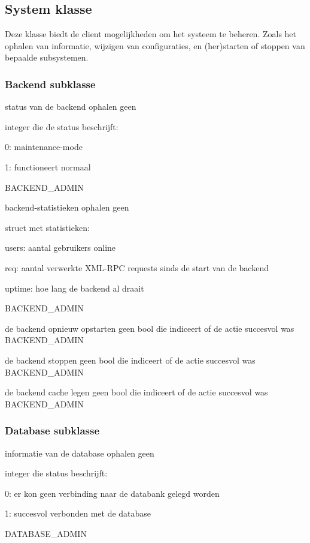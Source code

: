 \subsection{System klasse}

Deze klasse biedt de client mogelijkheden om het systeem te beheren. Zoals het ophalen van informatie, wijzigen van configuraties, en (her)starten of stoppen van bepaalde subsystemen.

\subsubsection{Backend subklasse}

	{ status van de backend ophalen }
	{ geen }
	{ integer die de status beschrijft:
		\begin{itemize_compact}
		\item{0: maintenance-mode}
		\item{1: functioneert normaal}
		\end{itemize_compact} }
	{ BACKEND\_ADMIN }

	{ backend-statistieken ophalen }
	{ geen }
	{ struct met statistieken:
		\begin{itemize_compact}
		\item{users: aantal gebruikers online}
		\item{req: aantal verwerkte XML-RPC requests sinds de start van de backend}
		\item{uptime: hoe lang de backend al draait}
		\end{itemize_compact} }
	{ BACKEND\_ADMIN }

	{ de backend opnieuw opstarten }
	{ geen }
	{ bool die indiceert of de actie succesvol was }
	{ BACKEND\_ADMIN }

	{ de backend stoppen }
	{ geen }
	{ bool die indiceert of de actie succesvol was }
	{ BACKEND\_ADMIN }

	{ de backend cache legen }
	{ geen }
	{ bool die indiceert of de actie succesvol was }
	{ BACKEND\_ADMIN }


\subsubsection{Database subklasse}

	{ informatie van de database ophalen }
	{ geen }
	{ integer die status beschrijft:
		\begin{itemize_compact}
		\item{0: er kon geen verbinding naar de databank gelegd worden}
		\item{1: succesvol verbonden met de database}
		\end{itemize_compact} }
	{ DATABASE\_ADMIN }


